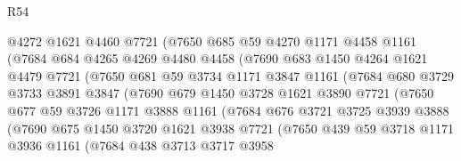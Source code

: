 \begin{lexlean}{R54}
\begin{coremodule}
                  @4272
                  @1621
                  @4460
                  @7721
                  (@7650
                    @685
                    @59
                    @4270
                    @1171
                    @4458
                    @1161
                    (@7684
                      @684
                      @4265
                      @4269
                      @4480
                      @4458
                      (@7690
                        @683
                        @1450
                        @4264
                        @1621
                        @4479
                        @7721
                        (@7650
                          @681
                          @59
                          @3734
                          @1171
                          @3847
                          @1161
                          (@7684
                            @680
                            @3729
                            @3733
                            @3891
                            @3847
                            (@7690
                              @679
                              @1450
                              @3728
                              @1621
                              @3890
                              @7721
                              (@7650
                                @677
                                @59
                                @3726
                                @1171
                                @3888
                                @1161
                                (@7684
                                  @676
                                  @3721
                                  @3725
                                  @3939
                                  @3888
                                  (@7690
                                    @675
                                    @1450
                                    @3720
                                    @1621
                                    @3938
                                    @7721
                                    (@7650
                                      @439
                                      @59
                                      @3718
                                      @1171
                                      @3936
                                      @1161
                                      (@7684
                                        @438
                                        @3713
                                        @3717
                                        @3958

\end{coremodule}
\end{lexlean}
